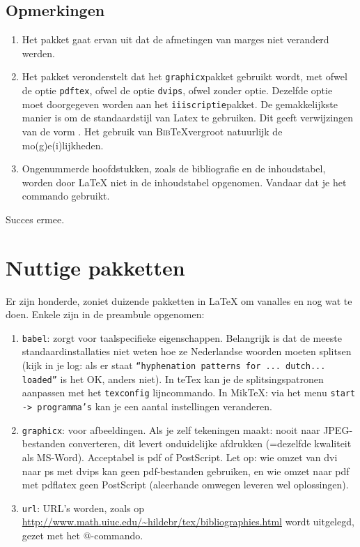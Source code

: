 \documentclass[a4paper,oneside]{book}
\begin{document}
\section{Opmerkingen}
\begin{enumerate}
\item Het pakket gaat ervan uit dat de afmetingen van marges niet veranderd werden.
\item Het pakket veronderstelt dat het {\tt graphicx}pakket gebruikt wordt, met ofwel de
optie {\tt pdftex}, ofwel de optie {\tt dvips}, ofwel zonder optie. Dezelfde optie moet 
doorgegeven worden aan het {\tt iiiscriptie}pakket. 
De gemakkelijkste manier is om de standaardstijl van Latex te gebruiken. Dit geeft 
verwijzingen van de vorm \cite{Mmils}.
Het gebruik van \textsc{Bib}\TeX vergroot natuurlijk de mo(g)e(i)lijkheden.
\item Ongenummerde hoofdstukken, zoals de bibliografie en de inhoudstabel, worden door
LaTeX niet in de inhoudstabel opgenomen. Vandaar dat je het commando
\verb@\addcontentsline@ gebruikt.
\end{enumerate}
Succes ermee.
\appendix
\chapter{Nuttige pakketten}
Er zijn honderde, zoniet duizende pakketten in LaTeX om vanalles en nog wat te doen.
Enkele zijn in de preambule opgenomen:
\begin{enumerate}
\item {\tt babel}: zorgt voor taalspecifieke eigenschappen. Belangrijk is dat de meeste
standaardinstallaties niet weten hoe ze Nederlandse woorden moeten splitsen (kijk in je
log: als er staat {\tt ``hyphenation patterns for ... dutch... loaded''} is het OK,
anders niet). In teTex kan je de splitsingspatronen aanpassen met het {\tt texconfig}
lijncommando. In MikTeX: via het menu {\tt start -> programma's} kan je een aantal
instellingen veranderen.
\item {\tt graphicx}: voor afbeeldingen. Als je zelf tekeningen maakt: nooit naar
JPEG-bestanden converteren, dit levert onduidelijke afdrukken (=dezelfde kwaliteit als
MS-Word). Acceptabel is pdf of PostScript. Let op: wie omzet van dvi naar ps met dvips
kan geen pdf-bestanden gebruiken, en wie omzet naar pdf met pdflatex geen PostScript
(aleerhande omwegen leveren wel oplossingen).
\item  {\tt url}: URL's worden, zoals op \url{http://www.math.uiuc.edu/~hildebr/tex/bibliographies.html}
wordt uitgelegd, gezet met het \verb@\url{}@-com\-man\-do.
\end{enumerate}
\end{document}
